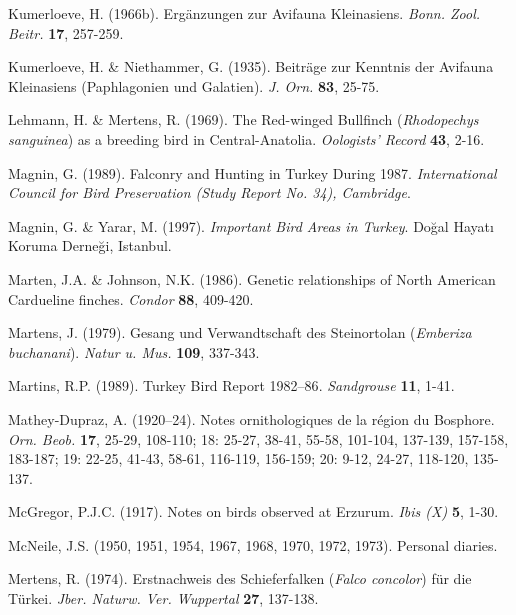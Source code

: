 \documentclass[
  10.5pt,
  a4paper,
  DIV=11,
  numbers=noendperiod,
  twocolumn]{scrreprt}
\newlength{\cslhangindent}
\newenvironment{CSLReferences}[2] %
 {\begin{list}{}{%
  \setlength{\itemindent}{0pt}
  \setlength{\leftmargin}{0pt}
  \setlength{\parsep}{0pt}
  \ifodd #1
   \setlength{\leftmargin}{\cslhangindent}
   \setlength{\itemindent}{-1\cslhangindent}
  \fi
  \setlength{\itemsep}{#2\baselineskip}}}
 {\end{list}}
\begin{document}
\begin{CSLReferences}{1}{1}
Kumerloeve, H. (1966b). {Ergänzungen zur Avifauna Kleinasiens}.
\emph{Bonn. Zool. Beitr.} \textbf{17}, 257-259.

Kumerloeve, H. \& Niethammer, G. (1935). {Beiträge zur Kenntnis der
Avifauna Kleinasiens (Paphlagonien und Galatien)}. \emph{J. Orn.}
\textbf{83}, 25-75.

Lehmann, H. \& Mertens, R. (1969). {The Red-winged Bullfinch
(\emph{Rhodopechys sanguinea}) as a breeding bird in Central-Anatolia}.
\emph{Oologists' Record} \textbf{43}, 2-16.

Magnin, G. (1989). {Falconry and Hunting in Turkey During 1987}.
\emph{International Council for Bird Preservation (Study Report No. 34),
Cambridge}.

Magnin, G. \& Yarar, M. (1997). \emph{{Important Bird Areas in Turkey}}.
Doğal Hayatı Koruma Derneği, Istanbul.

Marten, J.A. \& Johnson, N.K. (1986). {Genetic relationships of North
American Cardueline finches}. \emph{Condor} \textbf{88}, 409-420.

Martens, J. (1979). {Gesang und Verwandtschaft des Steinortolan
(\emph{Emberiza buchanani})}. \emph{Natur u. Mus.} \textbf{109},
337-343.

Martins, R.P. (1989). {Turkey Bird Report 1982--86}. \emph{Sandgrouse}
\textbf{11}, 1-41.

Mathey-Dupraz, A. (1920--24). {Notes ornithologiques de la région du
Bosphore}. \emph{Orn. Beob.} \textbf{17}, 25-29, 108-110; 18: 25-27,
38-41, 55-58, 101-104, 137-139, 157-158, 183-187; 19: 22-25, 41-43,
58-61, 116-119, 156-159; 20: 9-12, 24-27, 118-120, 135-137.

McGregor, P.J.C. (1917). {Notes on birds observed at Erzurum}.
\emph{Ibis (X)} \textbf{5}, 1-30.

McNeile, J.S. (1950, 1951, 1954, 1967, 1968, 1970, 1972, 1973).
{Personal diaries}.

Mertens, R. (1974). {Erstnachweis des Schieferfalken (\emph{Falco
concolor}) für die Türkei}. \emph{Jber. Naturw. Ver. Wuppertal}
\textbf{27}, 137-138.


\end{CSLReferences}
\end{document}
